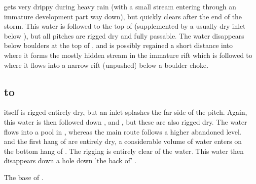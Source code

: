  gets very drippy during heavy rain (with a small stream entering through
an immature development part way down), but quickly clears after the end of the
storm. This water is followed to the top of  (supplemented by a usually dry
inlet below ), but all pitches are rigged dry and fully passable. 
The water disappears below boulders at the top of , and is possibly
regained a short distance into  where it forms the mostly
hidden stream in the immature rift which is followed to  where it
flows into a narrow rift (unpushed) below a boulder choke.

\subsection{ to }

 itself is rigged entirely dry, but an inlet splashes the far side of the
pitch. Again, this water is then followed down ,  and , but these
are also rigged dry. The water flows into a pool in , whereas
the main route follows a higher abandoned level.  and the first hang
of  are entirely dry, a considerable volume of water enters on the
bottom hang of . The rigging is entirely clear of the
water. This water then disappears down a hole down 'the back of' .

\begin{marginfigure}
\checkoddpage \ifoddpage \forcerectofloat \else \forceversofloat \fi
\centering
 \caption{The base of \protect{}. }
 \label{alchemy drips}
\end{marginfigure}

